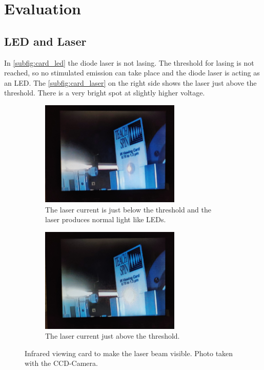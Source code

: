 \section{Evaluation}
\label{sec:Auswertung}

\subsection{LED and Laser}
\label{sec:lec_laser}
In \autoref{subfig:card_led} the diode laser is not lasing.
The threshold for lasing is not reached, so no stimulated emission can take place and the diode laser is acting as an LED.
The \autoref{subfig:card_laser} on the right side shows the laser just above the threshold.
There is a very bright spot at slightly higher voltage.
\begin{figure}
   \begin{subfigure}{0.48\textwidth}
       \centering
       \includegraphics[height=5cm]{content/data/laser_led.jpeg}
       \caption{The laser current is just below the threshold and the laser produces normal light like LEDs.}
       \label{subfig:card_led}
   \end{subfigure}
   \hfill
   \begin{subfigure}{0.48\textwidth}
       \centering
       \includegraphics[height=5cm]{content/data/Laser_lasing.jpeg}
       \caption{The laser current just above the threshold.}
       \label{subfig:card_laser}
   \end{subfigure}
   \caption{Infrared viewing card to make the laser beam visible. Photo taken with the CCD-Camera.}
   \label{fig:card}
\end{figure}

